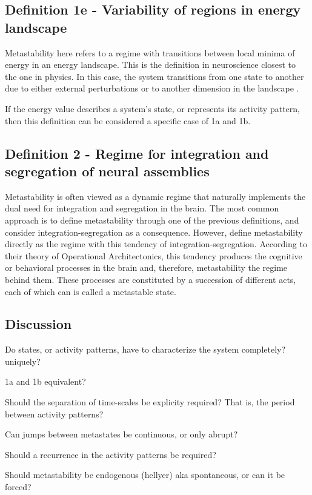 \documentclass[utf8]{frontiersSCNS} %
\begin{document}
\subsection{Definition 1e - Variability of regions in energy landscape}
Metastability here refers to a regime with transitions between local minima of energy in an energy landscape. This is the definition in neuroscience closest to the one in physics. In this case, the system transitions from one state to another due to either external perturbations or to another dimension in the landscape \cite{gili_2018, cavanna_2018}. 

If the energy value describes a system's state, or represents its activity pattern, then this definition can be considered a specific case of 1a and 1b. 


\subsection{Definition 2 - Regime for integration and segregation of neural assemblies}
Metastability is often viewed as a dynamic regime that naturally implements the dual need for integration and segregation in the brain. The most common approach is to define metastability through one of the previous definitions, and consider integration-segregation as a consequence. However, \cite{fingelkurts_2001, fingelkurts_2004} define metastability directly as the regime with this tendency of integration-segregation. According to their theory of Operational Architectonics, this tendency produces the cognitive or behavioral processes in the brain and, therefore, metastability the regime behind them. These processes are constituted by a succession of different acts, each of which can is called a metastable state. 

\subsection{Discussion}
Do states, or activity patterns, have to characterize the system completely? uniquely? 

1a and 1b equivalent?

Should the separation of time-scales be explicity required? That is, the period between activity patterns?

Can jumps between metastates be continuous, or only abrupt?

Should a recurrence in the activity patterns be required?

Should metastability be endogenous (hellyer) aka spontaneous, or can it be forced?
\end{document}
